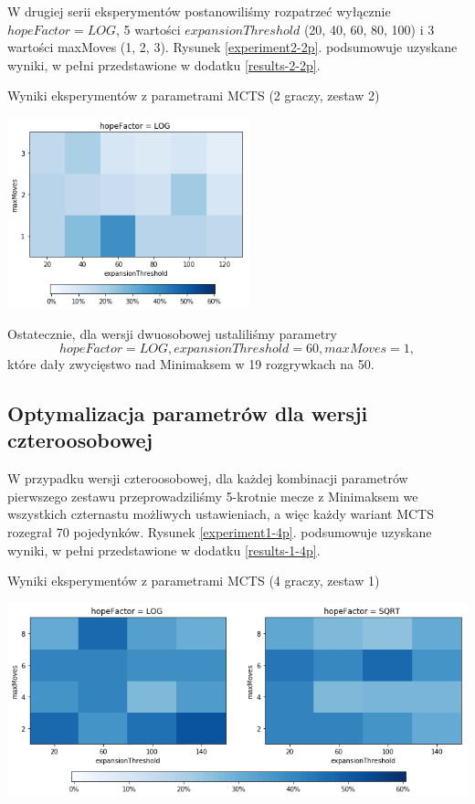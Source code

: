 \documentclass{pracamgr}
\begin{document}
W drugiej serii eksperymentów postanowiliśmy rozpatrzeć wyłącznie \(hopeFactor = LOG\), 5 wartości \(expansionThreshold\) (20, 40, 60, 80, 100) i 3 wartości maxMoves (1, 2, 3).
Rysunek \ref{experiment2-2p}. podsumowuje uzyskane wyniki, w pełni przedstawione w dodatku \ref{results-2-2p}.

\begin{rysunek}
\caption{Wyniki eksperymentów z parametrami MCTS (2 graczy, zestaw 2) \label{experiment2-2p}}
\centering
\includegraphics[width=70mm]{experiment2-2p.png}
\end{rysunek}

Ostatecznie, dla wersji dwuosobowej ustaliliśmy parametry \[hopeFactor = LOG, expansionThreshold = 60, maxMoves=1,\] które dały zwycięstwo nad Minimaksem w 19 rozgrywkach na 50.

\subsection{Optymalizacja parametrów dla wersji czteroosobowej}

W przypadku wersji czteroosobowej, dla każdej kombinacji parametrów pierwszego zestawu przeprowadziliśmy 5-krotnie mecze z Minimaksem we wszystkich czternastu możliwych ustawieniach, a więc każdy wariant MCTS rozegrał 70 pojedynków.
Rysunek \ref{experiment1-4p}. podsumowuje uzyskane wyniki, w pełni przedstawione w dodatku \ref{results-1-4p}.

\begin{rysunek}
\caption{Wyniki eksperymentów z parametrami MCTS (4 graczy, zestaw 1) \label{experiment1-4p}}
\centering
\includegraphics[width=140mm]{experiment1-4p.png}
\end{rysunek}
\end{document}
